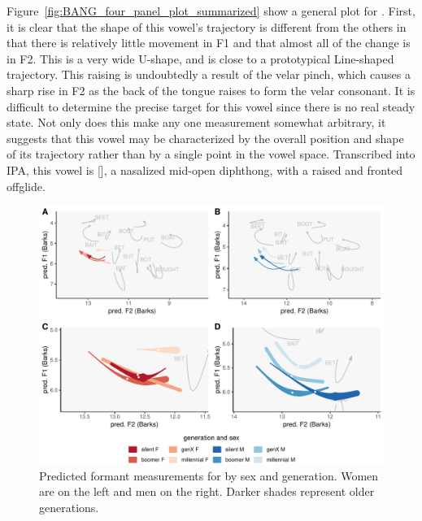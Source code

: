 Figure~\ref{fig:BANG_four_panel_plot_summarized} show a general plot for \bang. First, it is clear that the shape of this vowel's trajectory is different from the others in that there is relatively little movement in F1 and that almost all of the change is in F2. This is a very wide U-shape, and is close to a prototypical Line-shaped trajectory. This raising is undoubtedly a result of the velar pinch, which causes a sharp rise in F2 as the back of the tongue raises to form the velar consonant. It is difficult to determine the precise target for this vowel since there is no real steady state. Not only does this make any one measurement somewhat arbitrary, it suggests that this vowel may be characterized by the overall position and shape of its trajectory rather than by a single point in the vowel space. Transcribed into IPA, this vowel is []\vspace{-0.35em}, a nasalized mid-open diphthong, with a raised and fronted offglide.

\begin{figure}[tb!]
	\centering
	\includegraphics[width = 6.5in]{Figures/BANG/BANG_four_panel_plot.pdf}
	\caption[Predicted formant measurements for \bang by sex and generation.]{Predicted formant measurements for \bang by sex and generation. Women are on the left and men on the right. Darker shades represent older generations.}
	\label{fig:BANG_four_panel}
\end{figure}

